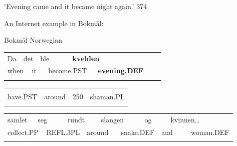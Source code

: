 \begin{styleTranslation}
‘Evening came and it became night again.’ 374

\end{styleTranslation}

An Internet example in Bokmål: 

\begin{listWWNumileveli}
\item {}

\begin{styleExample}
Bokmål Norwegian

\end{styleExample}

\end{listWWNumileveli}

\begin{tabular}{llllllllll}
\lsptoprule
Da & \multicolumn{2}{l}{det

} & \multicolumn{2}{l}{ble

} & \multicolumn{2}{l}{{\bfseries kvelden}

} & \multicolumn{2}{l}{} & \\
\multicolumn{2}{l}{when

} & \multicolumn{2}{l}{it

} & \multicolumn{2}{l}{become.PST

} & \multicolumn{2}{l}{{\bfseries evening.DEF}

} & \multicolumn{2}{l}{}\\
\lspbottomrule
\end{tabular}

\begin{tabular}{llll}
\lsptoprule
\multicolumn{4}{l}{hadde

}\\
have.PST & around & 250 & shaman.PL\\
\lspbottomrule
\end{tabular}

\begin{tabular}{llllllllllll}
\lsptoprule
samlet & \multicolumn{2}{l}{seg

} & \multicolumn{2}{l}{rundt

} & \multicolumn{2}{l}{slangen

} & \multicolumn{2}{l}{og

} & \multicolumn{2}{l}{kvinnen…

} & \\
\multicolumn{2}{l}{collect.PP

} & \multicolumn{2}{l}{REFL.3PL

} & \multicolumn{2}{l}{around

} & \multicolumn{2}{l}{snake.DEF

} & \multicolumn{2}{l}{and

} & \multicolumn{2}{l}{woman.DEF

}\\
\lspbottomrule
\end{tabular}

